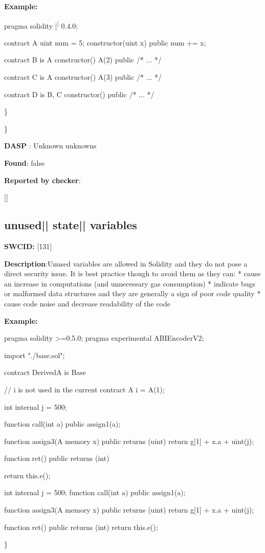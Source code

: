 \documentclass{article}
\begin{document}
\textbf{Example:} 
\begin{ffcode} 

pragma solidity |\textsuperscript| 0.4.0;

contract A{
    uint num = 5;
    constructor(uint x) public{
        num += x;
    }
}

contract B is A{
    constructor() A(2) public { /* ... */ }
}

contract C is A {
    constructor() A(3) public { /* ... */ }
}

contract D is B, C {
    constructor() public { /* ... */ }
}

\end{ffcode} 
\} 

\} 

\textbf{DASP} : Unknown unknowns

\textbf{Found}: false

\textbf{Reported by checker}: 
\begin{ffcode} 

[]
\end{ffcode} 
\subsection{unused{|\textunderscore| }state{|\textunderscore| }variables} 
\textbf{SWC{\textunderscore }ID:} [131]

\textbf{Description}:Unused variables are allowed in Solidity and they do not pose a direct security issue. It is best practice though to avoid them as they can:
* cause an increase in computations (and unnecessary gas consumption)
* indicate bugs or malformed data structures and they are generally a sign of poor code quality
* cause code noise and decrease readability of the code


\textbf{Example:} 
\begin{ffcode} 

pragma solidity >=0.5.0;
pragma experimental ABIEncoderV2;

import "./base.sol";

contract DerivedA is Base {
    // i is not used in the current contract
    A i = A(1);

    int internal j = 500;

    function call(int a) public {
        assign1(a);
    }

    function assign3(A memory x) public returns (uint) {
        return g[1] + x.a + uint(j);
    }

    function ret() public returns (int){
        return this.e();

    }
  int internal j = 500;
function call(int a) public {
        assign1(a);
    }

    function assign3(A memory x) public returns (uint) {
        return g[1] + x.a + uint(j);
    }

    function ret() public returns (int){
        return this.e();
  }
}

\end{ffcode} 
\} 
\end{document}
